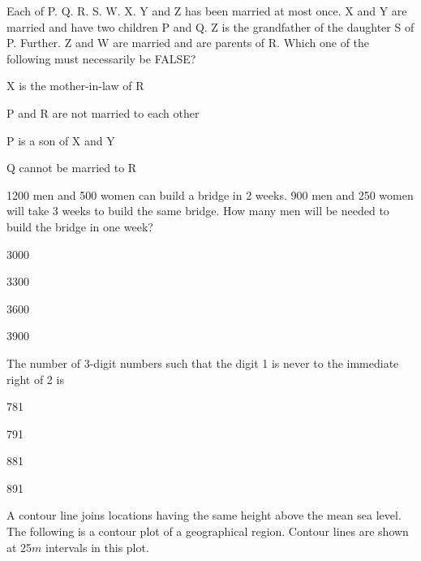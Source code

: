 \item Each of P. Q. R. S. W. X. Y and Z has been married at most once. X and Y are married and have two children P and Q. Z is the grandfather of the daughter S of P. Further. Z and W are married and are parents of R. Which one of the following must necessarily be FALSE?
\begin{enumerate}
\begin{multicols}{2}
\item X is the mother-in-law of R
\item P and R are not married to each other
\item P is a son of X and Y
\item Q cannot be married to R
\end{multicols}
\end{enumerate}
\item 1200 men and 500 women can build a bridge in 2 weeks. 900 men and 250 women will take 3 weeks to build the same bridge. How many men will be needed to build the bridge in one week?
\begin{enumerate}
\begin{multicols}{4}
\item 3000
\item 3300
\item 3600
\item 3900
\end{multicols}
\end{enumerate}
\item The number of 3-digit numbers such that the digit 1 is never to the immediate right of 2 is
\begin{enumerate}
\begin{multicols}{4}
\item 781
\item 791
\item 881
\item 891
\end{multicols}
\end{enumerate}
\item A contour line joins locations having the same height above the mean sea level. The following is a contour plot of a geographical region. Contour lines are shown at 25$m$ intervals in this plot.

